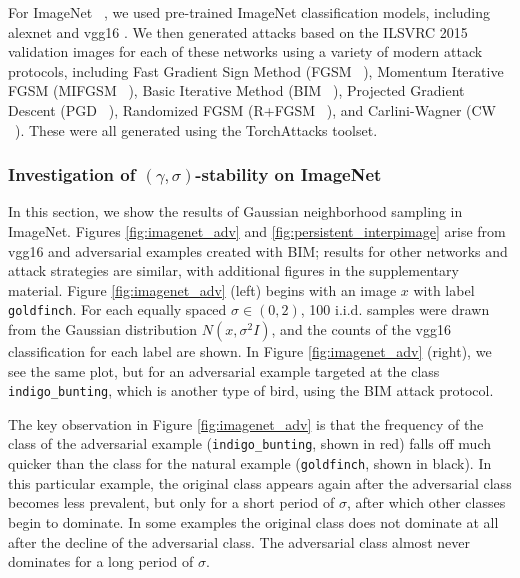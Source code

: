 For ImageNet ~\cite{Imagenet-old}, we used pre-trained ImageNet classification models, including alexnet \cite{alexnet} and vgg16 \cite{simonyan2014very}.
We then generated attacks based on the ILSVRC 2015 ~\cite{ILSVRC15} validation images for each of these networks using a variety of modern attack protocols, including Fast Gradient Sign Method (FGSM ~\cite{goodfellow_explaining_2014}), Momentum Iterative FGSM (MIFGSM ~\cite{dongMIFGSM}), Basic Iterative Method (BIM ~\cite{kurakin_adversarial_2016}), Projected Gradient Descent (PGD ~\cite{madry_towards_2017}), Randomized FGSM (R+FGSM ~\cite{tramer2018ensemble}), and Carlini-Wagner (CW ~\cite{carliniwagner}). These were all generated using the TorchAttacks \cite{kim2021torchattacks} toolset.

\subsubsection{Investigation of $(\gamma, \sigma)$-stability on ImageNet}

In this section, we show the results of Gaussian neighborhood sampling in ImageNet. Figures \ref{fig:imagenet_adv} and \ref{fig:persistent_interpimage} arise from vgg16 and adversarial examples created with BIM; results for other networks and attack strategies are similar, with additional figures in the supplementary material. Figure \ref{fig:imagenet_adv} (left) begins with an image $x$ with label \texttt{goldfinch}. For each equally spaced $\sigma\in(0,2)$, 100 i.i.d. samples were drawn from the Gaussian distribution $N(x,\sigma^2I)$, and the counts of the vgg16 classification for each label are shown. In Figure \ref{fig:imagenet_adv} (right), we see the same plot, but for an adversarial example targeted at the class \texttt{indigo\_bunting}, which is another type of bird, using the BIM attack protocol. %

The key observation in Figure \ref{fig:imagenet_adv} is that the frequency of the class of the adversarial example (\texttt{indigo\_bunting}, shown in red) falls off much quicker than the class for the natural example (\texttt{goldfinch}, shown in black). In this particular example, the original class appears again after the adversarial class becomes less prevalent, but only for a short period of $\sigma$, after which other classes begin to dominate. In some examples the original class does not dominate at all after the decline of the adversarial class. The adversarial class almost never dominates for a long period of $\sigma$. 


